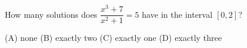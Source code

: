 How many solutions does $\dfrac{x^3+7}{x^2+1}=5$ have in the interval $[0,2]$?

(A) none \quad (B) exactly two \quad (C) exactly one \quad (D) exactly three
